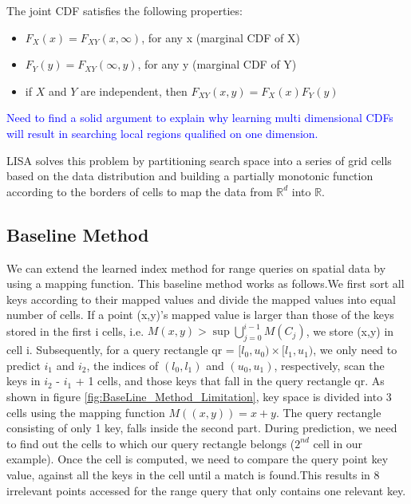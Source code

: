 The joint CDF satisfies the following properties:

\begin{itemize}
  \item  {$F_X(x)=F_{XY}(x,\infty)$, for any x (marginal CDF of X)}
  \item  {$F_Y(y)=F_{XY}(\infty,y)$, for any y (marginal CDF of Y)}
  \item  {if $X$ and $Y$ are independent, then $F_{XY}(x,y)=F_X(x)F_Y(y)$}
\end{itemize}

\textcolor{blue} {Need to find a solid argument to explain why learning multi dimensional CDFs will result in  searching local regions qualified on one dimension. }

LISA solves this problem by partitioning search space into a series of grid cells based on the data distribution and building a partially monotonic function according to the borders of cells to map the data from $\mathbb{R}^d$ into $\mathbb{R}$.

\subsection{Baseline Method}  

We can extend the learned index method for range queries on spatial data by using a mapping function. This baseline method works as follows.We first sort all keys according to their mapped values and divide the mapped values into equal number of cells. If a point (x,y)’s mapped value is larger than those of the keys stored in the first i cells, i.e. $M(x,y) > \sup \bigcup\limits_{j=0}^{i-1} M(C_{j})$, we store (x,y) in cell i. Subsequently, for a query rectangle
qr = $[l_{0},u_{0}) \times [l_{1},u_{1})$, we only need to predict $i_{1}$ and $i_{2}$, the indices of $(l_{0}, l_{1})$ and $(u_{0},u_{1})$, respectively, scan the keys in $i_{2}$ - $i_{1}$ + 1 cells, and those keys that fall in the query rectangle qr. As shown in figure \ref{fig:BaseLine_Method_Limitation}, key space is divided into 3 cells using the mapping function $M((x,y))= x+y$. The query rectangle consisting of only 1 key, falls inside the second part. During prediction, we need to find out the cells to which our query rectangle belongs ($2^{nd}$ cell in our example). Once the cell is computed, we need to compare the query point key value, against all the keys in the cell until a match is found.This results in 8 irrelevant points accessed for the range query that only contains one relevant key.

